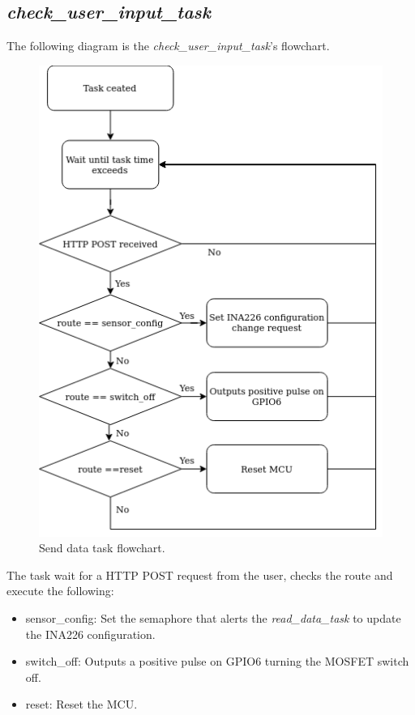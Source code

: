 \documentclass[../main.tex]{subfiles}
\begin{document}
    \pagebreak
    \subsection{\textit{check\_user\_input\_task}}
    The following diagram is the \textit{check\_user\_input\_task}'s flowchart.

    \begin{figure}[!h]
        \centerline{\includegraphics[scale=0.55]{media/check_user_input_task_flowchart.drawio.png}}
        \caption{Send data task flowchart.}
        \label{fig:check_user_input_task_flowchart}
    \end{figure}
    
    \justify
    The task wait for a HTTP POST request from the user, checks the route and execute the following:

    \begin{itemize}
        \item sensor\_config: Set the semaphore that alerts the \textit{read\_data\_task} to update the INA226 configuration.
        \item switch\_off: Outputs a positive pulse on GPIO6 turning the MOSFET switch off.
        \item reset: Reset the MCU.
    \end{itemize}


    
\end{document}
